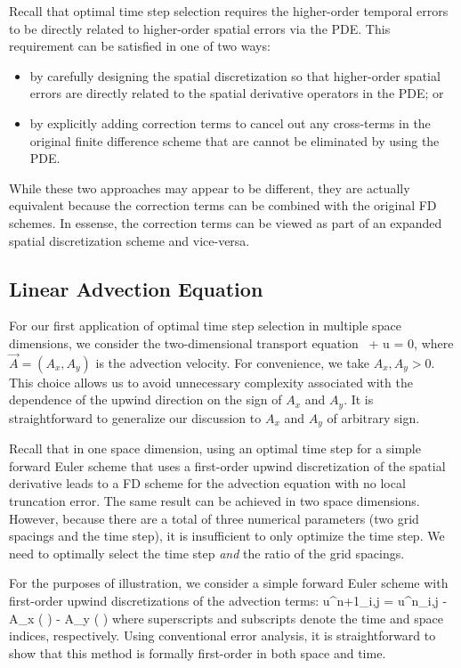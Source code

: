 \documentclass[oneeqnum,onefignum,onetabnum,onethmnum]{siamltex}
\begin{document}
Recall that optimal time step selection requires the higher-order temporal 
errors to be directly related to higher-order spatial errors via the PDE.  
This requirement can be satisfied in one of two ways:
\begin{itemize}
\item by carefully designing the spatial discretization so that 
      higher-order spatial errors are directly related to the spatial 
      derivative operators in the PDE; or
\item by explicitly adding correction terms to cancel out any cross-terms 
      in the original finite difference scheme that are cannot be eliminated 
      by using the PDE.
\end{itemize}
While these two approaches may appear to be different, they are actually 
equivalent because the correction terms can be combined with the original 
FD schemes.  In essense, the correction terms can be viewed as part of an 
expanded spatial discretization scheme and vice-versa.


\subsection{Linear Advection Equation}
For our first application of optimal time step selection in multiple
space dimensions, we consider the two-dimensional transport 
equation~\cite{evans_book}
\beq
   +  \cdot \nabla u = 0,
  \label{eq:advection_eqn_2d}
\eeq
where $\vec{A} = (A_x, A_y)$ is the advection velocity.  For convenience, we 
take $A_x, A_y > 0$.  This choice allows us to avoid unnecessary complexity 
associated with the dependence of the upwind direction on the sign of $A_x$ 
and $A_y$.  It is straightforward to generalize our discussion to $A_x$ and 
$A_y$ of arbitrary sign.

Recall that in one space dimension, using an optimal time step for
a simple forward Euler scheme that uses a first-order upwind discretization
of the spatial derivative leads to a FD scheme for the advection equation
with no local truncation error.  The same result can be achieved in 
two space dimensions.  However, because there are a total of three
numerical parameters (\ie two grid spacings and the time step), it is 
insufficient to only optimize the time step.  We need to optimally select
the time step \emph{and} the ratio of the grid spacings. 

For the purposes of illustration, we consider a simple forward Euler scheme 
with first-order upwind discretizations of the advection terms:
\beq
  u^{n+1}_{i,j} = u^{n}_{i,j}
  - A_x \dt \left(  \right)
  - A_y \dt \left(  \right)
  \label{eq:advection_eqn_2d_FD_scheme}
\eeq
where superscripts and subscripts denote the time and space indices, 
respectively.  Using conventional error analysis, it is straightforward to 
show that this method is formally first-order in both space and time.  
\end{document}
